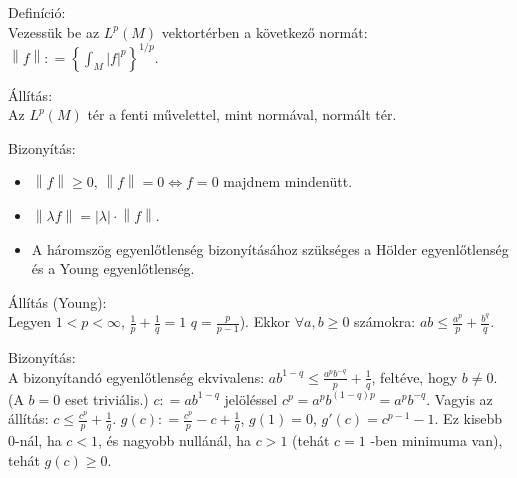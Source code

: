 \documentclass[12pt,a4paper]{scrartcl}
\providecommand{\tightlist}{%
  \setlength{\itemsep}{0pt}\setlength{\parskip}{0pt}}
\newenvironment{definicio}{}{}
\newenvironment{bizonyitas}{}{}
\newenvironment{allitas}{}{}
\begin{document}
\begin{definicio}

Definíció:\\
Vezessük be az \(L^{p}\left( M \right)\) vektortérben a következő
normát:
\(\left\| f \right\|: = \left\{ {\int_{M}\left| f \right|^{p}} \right\}^{1/p}\).

\end{definicio}

\begin{allitas}

Állítás:\\
Az \(L^{p}\left( M \right)\) tér a fenti művelettel, mint normával,
normált tér.

\end{allitas}

\begin{bizonyitas}

Bizonyítás:

\begin{itemize}
\tightlist
\item
  \(\left\| f \right\| \geq 0\),
  \(\left. \left\| f \right\| = 0\Leftrightarrow f = 0 \right.\) majdnem
  mindenütt.
\item
  \(\left\| {\lambda f} \right\| = \left| \lambda \right| \cdot \left\| f \right\|\).
\item
  A háromszög egyenlőtlenség bizonyításához szükséges a Hölder
  egyenlőtlenség és a Young egyenlőtlenség.
\end{itemize}

\end{bizonyitas}

\begin{allitas}

Állítás (Young):\\
Legyen \(1 < p < \infty\), \(\frac{1}{p} + \frac{1}{q} = 1\)
\(q = \frac{p}{p - 1}\)). Ekkor \(\forall a,b \geq 0\) számokra:
\(ab \leq \frac{a^{p}}{p} + \frac{b^{q}}{q}\).

\end{allitas}

\begin{bizonyitas}

Bizonyítás:\\
A bizonyítandó egyenlőtlenség ekvivalens:
\(ab^{1 - q} \leq \frac{a^{p}b^{- q}}{p} + \frac{1}{q}\), feltéve, hogy
\(b \neq 0\). (A \(b = 0\) eset triviális.) \(c: = ab^{1 - q}\)
jelöléssel \(c^{p} = a^{p}b^{{({1 - q})}p} = a^{p}b^{- q}\). Vagyis az
állítás: \(c \leq \frac{c^{p}}{p} + \frac{1}{q}\).
\(g\left( c \right): = \frac{c^{p}}{p} - c + \frac{1}{q}\),
\(g\left( 1 \right) = 0\), \(g'\left( c \right) = c^{p - 1} - 1\). Ez
kisebb 0-nál, ha \(c < 1\), és nagyobb nullánál, ha \(c > 1\) (tehát
\(c = 1\) -ben minimuma van), tehát \(g\left( c \right) \geq 0\).

\end{bizonyitas}
\end{document}
